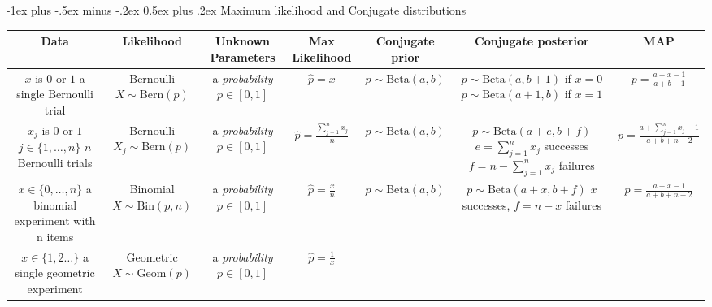 \documentclass[10pt,landscape]{article}
\makeatletter
\newcommand{\Bern}{\textrm{Bern}}
\newcommand{\Bin}{\textrm{Bin}}
\newcommand{\Beta}{\textrm{Beta}}
\newcommand{\Geom}{\textrm{Geom}}
\renewcommand{\section}{\@startsection{section}{1}{0mm}%
                                {-1ex plus -.5ex minus -.2ex}%
                                {0.5ex plus .2ex}%
                                {\normalfont\large\bfseries}}
\makeatother
\begin{document}
\section{Maximum likelihood and Conjugate distributions}
\begin{center}
\renewcommand{\arraystretch}{3.7}
\begin{tabular}{ccccccc}
\textbf{Data} & \textbf{Likelihood} & \textbf{Unknown Parameters} & \textbf{Max Likelihood} &\textbf{Conjugate prior}  & \textbf{Conjugate posterior} & \textbf{MAP}
\\\hline
\shortstack{$x$ is $0$ or $1$ \\ a single Bernoulli trial} & \shortstack{Bernoulli \\ $X\sim\Bern(p)$} & \shortstack{a \emph{probability} \\ $p\in [0,1]$} &
  $\hat{p}=x$&
  $p\sim \Beta(a,b)$ & \shortstack{$p\sim \Beta(a,b+1)$ if $x=0$\\$p\sim \Beta(a+1,b)$ if $x=1$} &
  $p=\frac{a+x-1}{a+b-1}$
\\\hline
\shortstack{$x_j$ is $0$ or $1$\\ $j\in\{1,\dots,n\}$ \\ $n$ Bernoulli trials} & \shortstack{Bernoulli \\ $X_j\sim\Bern(p)$} & \shortstack{a \emph{probability} \\ $p\in [0,1]$} &
  $\hat{p}=\frac{\sum_{j=1}^n x_j}{n}$ &
  $p\sim \Beta(a,b)$ & \shortstack{$p\sim \Beta(a+e,b+f)$\\$e=\sum_{j=1}^n x_j$ successes \\ $f=n-\sum_{j=1}^n x_j$ failures} &
  $p=\frac{a+\sum_{j=1}^n x_j - 1}{a+b+n - 2}$
\\\hline
  \shortstack{$x\in \{0,\dots,n\}$ \\ a binomial experiment with n items} &
  \shortstack{Binomial \\ $X\sim\Bin(p, n)$} & \shortstack{a \emph{probability} \\ $p\in [0,1]$} &
  $\hat{p}=\frac{x}{n}$ &
  $p\sim \Beta(a,b)$ & \shortstack{$p\sim \Beta(a+x,b+f)$\\$x$ successes, $f=n-x$ failures} &
  $p=\frac{a+x-1}{a+b+n-2}$
\\\hline
  \shortstack{$x\in \{1,2\dots\}$ \\ a single geometric experiment}
  & \shortstack{Geometric \\ $X\sim\Geom(p)$} & \shortstack{a \emph{probability} \\ $p\in [0,1]$} &
  $\hat{p}=\frac{1}{x}$ &

\end{tabular}
\end{center}
\end{document}
